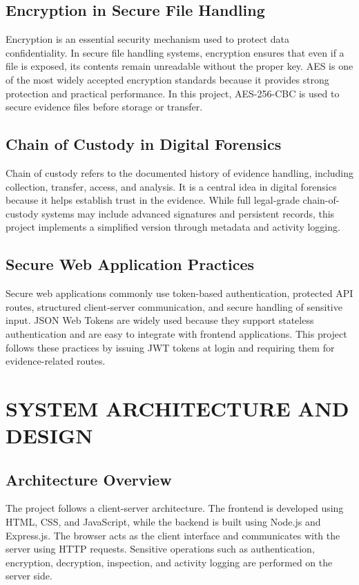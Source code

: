\documentclass[12pt,a4paper]{report}
\begin{document}
\section{Encryption in Secure File Handling}
Encryption is an essential security mechanism used to protect data confidentiality. In secure file handling systems, encryption ensures that even if a file is exposed, its contents remain unreadable without the proper key. AES is one of the most widely accepted encryption standards because it provides strong protection and practical performance. In this project, AES-256-CBC is used to secure evidence files before storage or transfer.

\section{Chain of Custody in Digital Forensics}
Chain of custody refers to the documented history of evidence handling, including collection, transfer, access, and analysis. It is a central idea in digital forensics because it helps establish trust in the evidence. While full legal-grade chain-of-custody systems may include advanced signatures and persistent records, this project implements a simplified version through metadata and activity logging.

\section{Secure Web Application Practices}
Secure web applications commonly use token-based authentication, protected API routes, structured client-server communication, and secure handling of sensitive input. JSON Web Tokens are widely used because they support stateless authentication and are easy to integrate with frontend applications. This project follows these practices by issuing JWT tokens at login and requiring them for evidence-related routes.

\chapter{SYSTEM ARCHITECTURE AND DESIGN}

\section{Architecture Overview}
The project follows a client-server architecture. The frontend is developed using HTML, CSS, and JavaScript, while the backend is built using Node.js and Express.js. The browser acts as the client interface and communicates with the server using HTTP requests. Sensitive operations such as authentication, encryption, decryption, inspection, and activity logging are performed on the server side.
\end{document}

